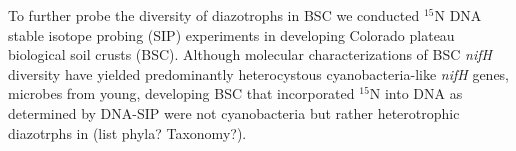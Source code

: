 To further probe the diversity of diazotrophs in BSC we conducted $^{15}$N DNA stable isotope probing (SIP) experiments in developing Colorado plateau biological soil crusts (BSC). Although molecular characterizations of BSC \textit{nifH} diversity have yielded predominantly heterocystous cyanobacteria-like \textit{nifH} genes, microbes from young, developing BSC that incorporated $^{15}$N into DNA as determined by DNA-SIP were not cyanobacteria but rather heterotrophic diazotrphs in (list phyla? Taxonomy?).


